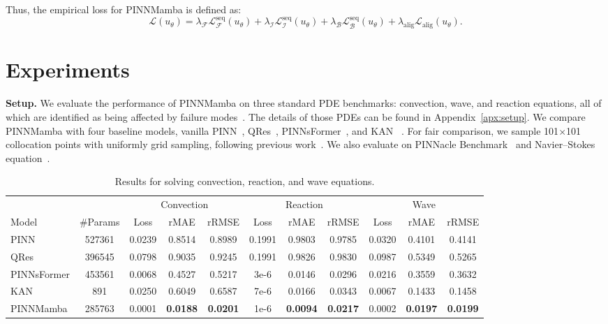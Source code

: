 \documentclass{article}
\theoremstyle{plain}
\theoremstyle{definition}
\theoremstyle{remark}
\begin{document}
Thus, the empirical loss for PINNMamba is defined as:
\small
\begin{equation}
     \mathcal L(u_\theta)=\lambda_{\mathcal F}\mathcal L_{\mathcal F}^\text{seq}(u_\theta)+\lambda_{\mathcal I}\mathcal L_{\mathcal I}^\text{seq}(u_\theta)+\lambda_{\mathcal B}\mathcal L_{\mathcal B}^\text{seq}(u_\theta)+\lambda_\text{alig}\mathcal L_\text{alig}(u_\theta).
\end{equation}
\vspace{-8mm}
    

\normalsize


\section{Experiments}
\textbf{Setup.} We evaluate the performance of PINNMamba on three standard PDE benchmarks: convection, wave, and reaction equations, all of which are identified as being affected by failure modes~\cite{krishnapriyan2021characterizing,zhao2024pinnsformer}. The details of those PDEs can be found in Appendix~\ref{apx:setup}.
    We compare PINNMamba with four baseline models, vanilla PINN~\cite{raissi2019physics}, QRes~\cite{bu2021quadratic}, PINNsFormer~\cite{zhao2024pinnsformer}, and KAN~\cite{liu2024kan} .
For fair comparison, we sample 101$\times$101 collocation points with uniformly grid sampling, following previous work~\cite{zhao2024pinnsformer,wu2024ropinn}. We also evaluate on PINNacle Benchmark~\cite{hao2023pinnacle} and Navier–Stokes equation~\cite{raissi2019physics}.

\begin{table}

  \caption{Results for solving convection, reaction, and wave equations.}
  \label{sample-table}
  
  \centering
    \small
  \begin{tabular}{l|c|ccc|ccc|ccc}

    \toprule 
  & & \multicolumn{3}{c}{Convection }&\multicolumn{3}{c}{Reaction}&\multicolumn{3}{c}{Wave}\\
    \cmidrule(lr){3-5}\cmidrule(lr){6-8}\cmidrule(lr){9-11}
   Model & \#Params &Loss & rMAE & rRMSE & Loss & rMAE & rRMSE& Loss & rMAE & rRMSE
 \\   \midrule
    PINN&527361& 0.0239 & 0.8514 & 0.8989& 0.1991 & 0.9803 & 0.9785& 0.0320 & 0.4101 & 0.4141\\
    QRes & 396545& 0.0798 & 0.9035 & 0.9245& 0.1991 & 0.9826 & 0.9830& 0.0987 & 0.5349 & 0.5265\\
    PINNsFormer &453561 & 0.0068 & 0.4527 & 0.5217& 3e-6& 0.0146 & 0.0296 & 0.0216 & 0.3559 & 0.3632\\
     KAN&891& 0.0250 & 0.6049 & 0.6587& 7e-6 & 0.0166 & 0.0343& 0.0067 & 0.1433 & 0.1458\\
   \rowcolor{mygray}   PINNMamba  & 285763&0.0001 & \textbf{0.0188} & \textbf{0.0201}&1e-6&\textbf{0.0094}&\textbf{0.0217}& 0.0002 & \textbf{0.0197} & \textbf{0.0199} \\

    \bottomrule
  \end{tabular}
  \normalsize
  \label{tab:diff}

\end{table}
\end{document}
